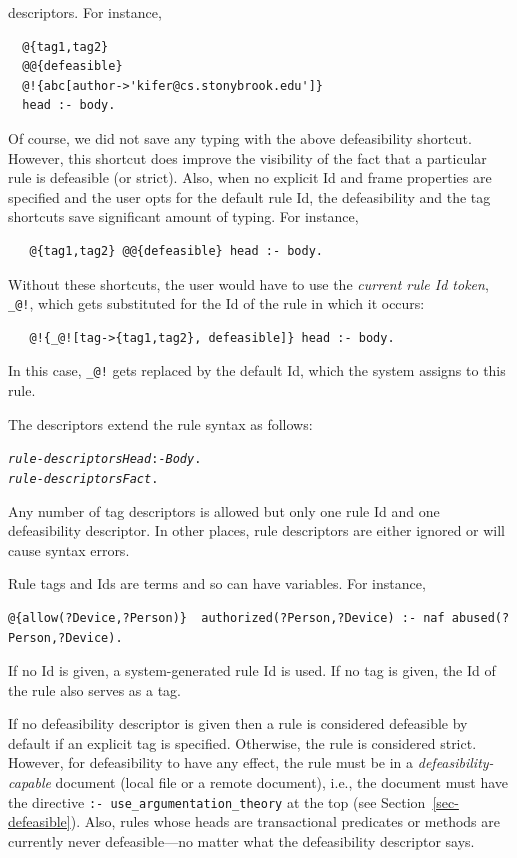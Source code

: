 \documentclass[11pt]{article}
\begin{document}
\begin{itemize}
  descriptors. For instance,
\begin{verbatim}
  @{tag1,tag2}
  @@{defeasible}
  @!{abc[author->'kifer@cs.stonybrook.edu']}
  head :- body.
\end{verbatim}
  Of course, we did not save any typing with the above defeasibility
  shortcut. However, this shortcut does improve the visibility of
  the fact that a particular rule is defeasible (or strict). Also, when no
  explicit Id and frame properties are specified and the user opts for
  the default rule Id, the defeasibility and the tag shortcuts save
  significant amount of typing. For instance,
\begin{verbatim}
   @{tag1,tag2} @@{defeasible} head :- body.
\end{verbatim}
  Without these shortcuts, the user would have to use the \emph{current rule Id
  token}, \texttt{\_@!}, which gets substituted for the Id of the rule
in which it occurs:
\begin{verbatim}
   @!{_@![tag->{tag1,tag2}, defeasible]} head :- body.
\end{verbatim}
   In this case, \texttt{\_@!} gets replaced by the default Id,
   which the system assigns to this rule. 
\end{itemize}
The descriptors extend the rule syntax as follows:
\begin{alltt}
   \emph{rule-descriptors} \emph{Head} :- \emph{Body}.
   \emph{rule-descriptors} \emph{Fact}.
\end{alltt}
Any number of tag descriptors is allowed but only one rule Id and one
defeasibility descriptor.
In other places, rule descriptors are either ignored or will cause syntax
errors. 

Rule tags and Ids are terms and so can have variables. For instance,
\begin{verbatim}
@{allow(?Device,?Person)}  authorized(?Person,?Device) :- naf abused(?Person,?Device).
\end{verbatim}
If no Id is given, a system-generated rule Id is used. If no tag is given,
the Id of the rule also serves as a tag.

If no defeasibility descriptor is given then a rule is considered
defeasible by default if an explicit tag is specified.
Otherwise, the rule is considered strict.  However, for defeasibility to
have any effect, the rule must be in a  \emph{defeasibility-capable} document (local file or a
remote document), i.e., the document
must have the directive \texttt{:- use\_argumentation\_theory} at
the top (see Section~\ref{sec-defeasible}).
Also, rules whose heads are transactional predicates or methods are
currently never
defeasible---no matter what the defeasibility descriptor says.
\end{document}
